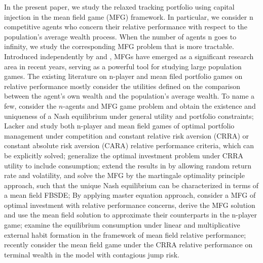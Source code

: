 \documentclass[11pt,times,letter]{article}
\numberwithin{equation}{section}
\begin{document}
In the present paper, we study the relaxed tracking portfolio using capital injection in the mean field game (MFG) framework. In particular, we consider n competitive agents who concern their relative performance with respect to the population's average wealth process.  When the number of agents n goes to infinity, we study the corresponding MFG problem that is more tractable. Introduced independently by  \cite{Huang06} and \cite{Lasry07}, MFGs have emerged as a significant research area in recent years, serving as a powerful tool for studying  large population games. The existing literature on n-player and mean filed portfolio games on relative performance mostly consider the utilities defined on the comparison between the agent's own wealth and the population's average wealth. To name a few,  \cite{Espinosa15} consider the $n$-agents and MFG game problem and obtain the existence and uniqueness of a Nash equilibrium under general utility and portfolio constraints; Lacker and  \cite{Lacker19} study both n-player and mean field games of optimal portfolio management under competition and constant relative risk aversion (CRRA) or constant absolute risk aversion (CARA) relative performance criteria, which can be explicitly solved;  \cite{Lacker20} generalize the optimal investment problem under CRRA utility to include consumption;  \cite{FuZhou23} extend the results in \cite{Lacker19} by allowing random return rate and volatility, and solve the MFG  by the martingale optimality principle approach, such that the unique Nash equilibrium can be  characterized in terms of a mean field FBSDE; By applying master equation approach,  \cite{Souganidis24}  consider a MFG of optimal investment  with relative performance concerns, derive the MFG solution and use the mean field solution to approximate their counterparts in the n-player game;  \cite{BWY24a} examine the equilibrium consumption under linear and multiplicative external habit formation in the framework of mean field relative performance;  \cite{BWY24b} recently consider the mean field game under the CRRA relative performance on terminal wealth in the model with contagious jump risk.
\end{document}
